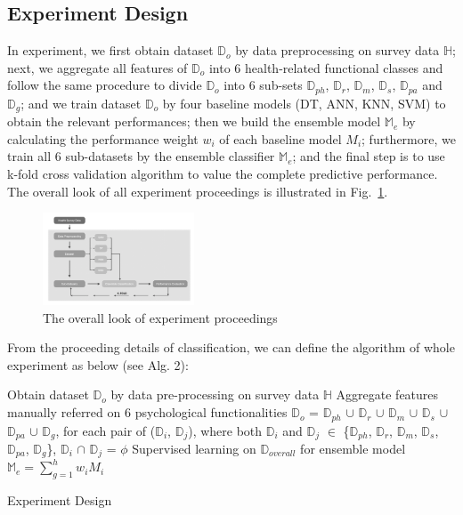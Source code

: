 \documentclass[10pt,journal,compsoc]{IEEEtran}
\begin{document}
\subsection{Experiment Design}
In experiment, we first obtain dataset $\mathbb{D}_{o}$ by data preprocessing on survey data $\mathbb{H}$; next, we aggregate all features of $\mathbb{D}_{o}$ into 6 health-related functional classes and follow the same procedure to divide $\mathbb{D}_{o}$ into 6 sub-sets $\mathbb{D}_{ph}$, $\mathbb{D}_{r}$, $\mathbb{D}_{m}$, $\mathbb{D}_{s}$, $\mathbb{D}_{pa}$ and $\mathbb{D}_{g}$; and we train dataset $\mathbb{D}_{o}$ by four baseline models (DT, ANN, KNN, SVM) to obtain the relevant performances; then we build the ensemble model $\mathbb{M}_{e}$ by calculating the performance weight $w_{i}$ of each baseline model $M_{i} $; furthermore, we train all 6 sub-datasets by the ensemble classifier $\mathbb{M}_{e}$; and the final step is to use k-fold cross validation algorithm to value the complete predictive performance. The overall look of all experiment proceedings is illustrated in Fig.~\ref{fig4}. 
\begin{figure}[h]
\includegraphics[width=0.4\textwidth]{experiment.png}
\centering
\captionsetup{justification=centering}
\caption{The overall look of experiment proceedings} \label{fig4}
\end{figure}

From the proceeding details of classification, we can define the algorithm of whole experiment as below (see Alg. 2): 
\IncMargin{2em}
\begin{algorithm}[h]
\BlankLine
Obtain dataset $\mathbb{D}_{o}$ by data pre-processing on survey data $\mathbb{H}$\;
Aggregate features manually referred on 6 psychological functionalities \;
$\mathbb{D}_{o}$ = $\mathbb{D}_{ph}$ $\cup$ $\mathbb{D}_{r}$ $\cup$ $\mathbb{D}_{m}$ $\cup$  $\mathbb{D}_{s}$ $\cup$ $\mathbb{D}_{pa}$ $\cup$ $\mathbb{D}_{g}$, for each pair of ($\mathbb{D}_{i}$, $\mathbb{D}_{j}$), where both $\mathbb{D}_{i}$ and  $\mathbb{D}_{j}$ $\in$ \{$\mathbb{D}_{ph}$, $\mathbb{D}_{r}$, $\mathbb{D}_{m}$, $\mathbb{D}_{s}$, $\mathbb{D}_{pa}$, $\mathbb{D}_{g}$\}, $\mathbb{D}_{i}$ $\cap$ $\mathbb{D}_{j}$ = $\phi$\;
Supervised learning on $\mathbb{D}_{overall}$ for ensemble model $\mathbb{M}_{e} = \sum_{g = 1}^{h} w_{i} M_{i} $\;
\caption{Experiment Design}\label{experiment}
\end{algorithm}\DecMargin{2em}
\end{document}
